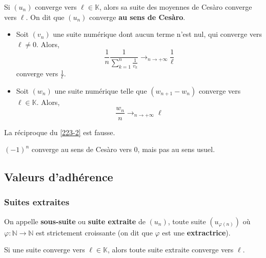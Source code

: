   \begin{theorem}
    \label{223-2}
    Si $(u_n)$ converge vers $\ell \in \mathbb{K}$, alors sa suite des moyennes de Cesàro converge vers $\ell$. On dit que $(u_n)$ converge \textbf{au sens de Cesàro}.
  \end{theorem}

  \begin{example}
    \begin{itemize}
      \item Soit $(v_n)$ une suite numérique dont aucun terme n'est nul, qui converge vers $\ell \neq 0$. Alors,
      \[ \frac{1}{n} \frac{1}{\sum_{k=1}^n \frac{1}{v_k}} \longrightarrow_{n \rightarrow +\infty} \frac{1}{\ell} \]
      converge vers $\frac{1}{\ell}$.
      \item Soit $(w_n)$ une suite numérique telle que $(w_{n+1} - w_n)$ converge vers $\ell \in \mathbb{K}$. Alors,
      \[ \frac{w_n}{n} \longrightarrow_{n \rightarrow +\infty} \ell \]
    \end{itemize}
  \end{example}

  \begin{remark}
    La réciproque du \cref{223-2} est fausse.
  \end{remark}

  \begin{example}
    $(-1)^n$ converge au sens de Cesàro vers $0$, mais pas au sens usuel.
  \end{example}

  \subsection{Valeurs d'adhérence}

  \subsubsection{Suites extraites}


  \begin{definition}
    On appelle \textbf{sous-suite} ou \textbf{suite extraite} de $(u_n)$, toute suite $(u_{\varphi(n)})$ où $\varphi : \mathbb{N} \rightarrow \mathbb{N}$ est strictement croissante (on dit que $\varphi$ est une \textbf{extractrice}).
  \end{definition}

  \begin{proposition}
    Si une suite converge vers $\ell \in \mathbb{K}$, alors toute suite extraite converge vers $\ell$.
  \end{proposition}

